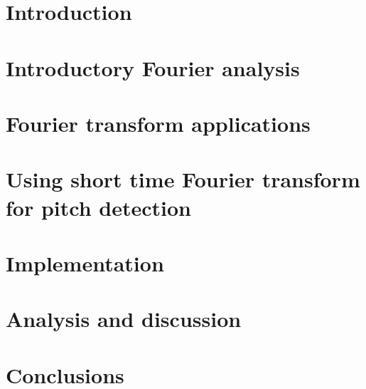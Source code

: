\documentclass[a4paper,12pt]{article}
\begin{document}

\renewcommand{\cftsecfont}{\fontfamily{comfortaa}\selectfont}

\renewcommand{\cftsubsecfont}{\fontfamily{comfortaa}\selectfont}
\renewcommand{\cftsubsubsecfont}{\fontfamily{comfortaa}\selectfont}
\renewcommand{\contentsname}{\fontfamily{comfortaa}\selectfont Table of Contents}



\tableofcontents    

\section{Introduction}
 

\section{Introductory Fourier analysis}
 

\section{Fourier transform applications}
 


\section{ Using short time Fourier transform for pitch detection}

\section{Implementation}

\section{Analysis and discussion}

\section{Conclusions}



\end{document}
